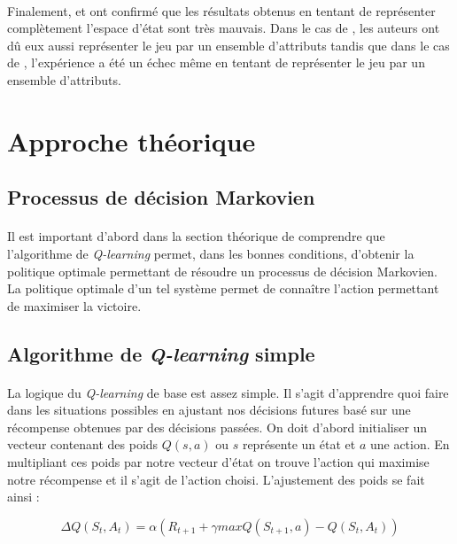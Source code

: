 \documentclass[a4paper, 12pt]{article} %
\begin{document}
    	\paragraph{}
	Finalement, \cite{toomuchstate} et \cite{noobs} ont confirmé que les résultats obtenus en tentant de représenter
	complètement l'espace d'état sont très mauvais. Dans le cas de \cite{toomuchstate}, les auteurs ont dû eux aussi 
	représenter le jeu par un ensemble d'attributs tandis que dans le cas de \cite{noobs}, l'expérience a été un échec
	même en tentant de représenter le jeu par un ensemble d'attributs.
	

\section{Approche théorique}
    \subsection{Processus de décision Markovien}
        \paragraph{}
        Il est important d'abord dans la section théorique de comprendre que l'algorithme de \textit{Q-learning} permet,
        dans les bonnes conditions, d'obtenir la politique optimale permettant de résoudre un processus de décision Markovien.
        La politique optimale d'un tel système permet de connaître l'action permettant de maximiser la victoire\cite{qlearning}.

    \subsection{Algorithme de \textit{Q-learning} simple}
    	\paragraph{}
	La logique du \textit{Q-learning} de base est assez simple. Il s'agit d'apprendre quoi faire dans les situations
	possibles en ajustant nos décisions futures basé sur une récompense obtenues par des décisions passées.
	On doit d'abord initialiser un vecteur contenant des poids $Q(s, a)$ ou $s$ représente un état et $a$ une action.
	En multipliant ces poids par notre vecteur d'état on trouve l'action qui maximise notre récompense et il s'agit 
	de l'action choisi. L'ajustement des poids se fait ainsi :

	\begin{equation}
	    \Delta Q(S_{t}, A_{t}) = \alpha (R_{t+1} + \gamma max Q(S_{t+1}, a ) - Q(S_{t}, A_{t}))
	\end{equation}
\end{document}

